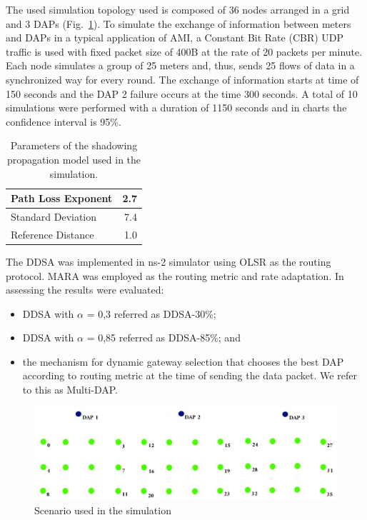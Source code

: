 \documentclass[conference]{IEEEtran}
\begin{document}
The used simulation topology used is composed of 36 nodes arranged in a grid and 3 DAPs (Fig.~\ref{mapa}). To simulate the exchange of information between meters and DAPs in a typical application of AMI, a Constant Bit Rate (CBR) UDP traffic is used with fixed packet size of 400B \cite{Plan2011} at the rate of 20 packets per minute. Each node simulates a group of 25 meters and, thus, sends 25 flows of data in a synchronized way for every round. The exchange of information starts at time of 150 seconds and the DAP 2 failure occurs  at the time 300 seconds. A total of 10 simulations were performed with a duration of 1150 seconds and in charts the confidence interval is 95\%.


\begin{table}[htbp]
\caption{Parameters of the shadowing propagation model used in the simulation.}
\begin{center}\begin {tabular}{|l|r|}
\hline
	Path Loss Exponent & 2.7\\
\hline
	Standard Deviation & 7.4\\
\hline
	Reference Distance & 1.0\\
\hline
\end{tabular}
\end{center}
	\label{param}
\end{table}



The DDSA was implemented in ns-2 simulator using OLSR \cite{clausen2003optimized} as the routing protocol. MARA \cite{6051505} was employed as the routing metric and rate adaptation. In assessing the results were evaluated:

\begin{itemize}
  \item[(1)] DDSA with $\alpha$ = 0,3 referred as DDSA-30\%;
  \item[(2)] DDSA with $\alpha$ = 0,85 referred as DDSA-85\%; and
  \item[(3)] the mechanism for dynamic gateway selection that chooses the best DAP  according to routing metric at the time of sending the data packet. We refer to this as Multi-DAP.
\end{itemize}
 
 


\begin{figure}[hbp]
\centering
\includegraphics[scale=.23]{IEEE-consolidados/grid36.jpg}
\caption{Scenario used in the simulation}
\label{mapa}
\end{figure}
\end{document}
